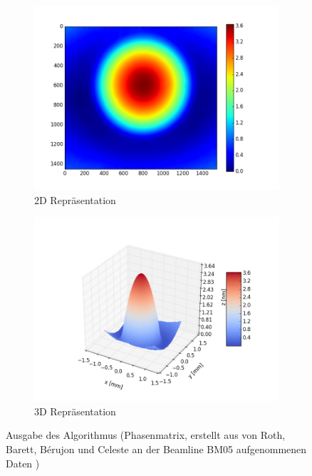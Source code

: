 \begin{figure}[htbp]
	\centering
	\begin{subfigure}[b]{0.45\textwidth}
		\centering
		\includegraphics[width=\textwidth]{img/2D_E10001_edf_ref_start0001_1-10_edf}
		\caption[2D Ausgabe]{2D Repräsentation}
		\label{fig:ausgabe_2d}
	\end{subfigure}
	\begin{subfigure}[b]{0.45\textwidth}
		\centering
		\includegraphics[width=\textwidth]{img/3D_E10001_edf_ref_start0001_1-10_edf}
		\caption[3D Ausgabe]{3D Repräsentation}
		\label{fig:ausgabe_3d}
	\end{subfigure}
	\caption[Ausgabe]{Ausgabe des Algorithmus (Phasenmatrix, erstellt aus von Roth, Barett, Bérujon und Celeste an der Beamline BM05 aufgenommenen Daten \cite{RBB+17})}
	\label{fig:ausgabebild}
\end{figure}

